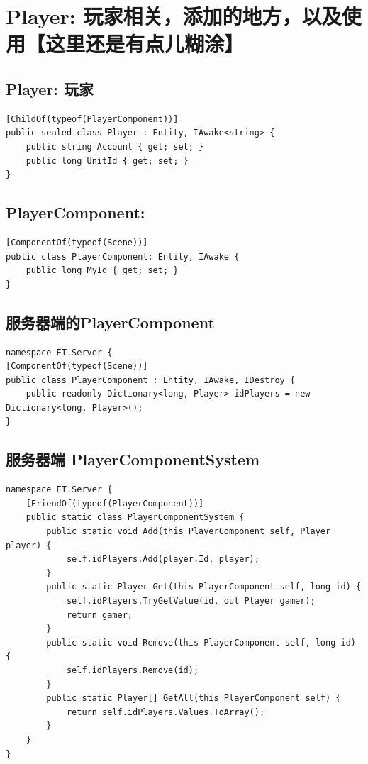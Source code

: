\documentclass[9pt, b5paper]{article}
\begin{document}
\section{Player: 玩家相关，添加的地方，以及使用【这里还是有点儿糊涂】}
\label{sec-9}
\subsection{Player: 玩家}
\label{sec-9-1}
\begin{verbatim}
[ChildOf(typeof(PlayerComponent))]
public sealed class Player : Entity, IAwake<string> {
    public string Account { get; set; }
    public long UnitId { get; set; }
}
\end{verbatim}
\subsection{PlayerComponent:}
\label{sec-9-2}
\begin{verbatim}
[ComponentOf(typeof(Scene))]
public class PlayerComponent: Entity, IAwake {
    public long MyId { get; set; }
}
\end{verbatim}
\subsection{服务器端的PlayerComponent}
\label{sec-9-3}
\begin{verbatim}
namespace ET.Server {
[ComponentOf(typeof(Scene))]
public class PlayerComponent : Entity, IAwake, IDestroy {
    public readonly Dictionary<long, Player> idPlayers = new Dictionary<long, Player>();
}
\end{verbatim}
\subsection{服务器端 PlayerComponentSystem}
\label{sec-9-4}
\begin{verbatim}
namespace ET.Server {
    [FriendOf(typeof(PlayerComponent))]
    public static class PlayerComponentSystem {
        public static void Add(this PlayerComponent self, Player player) {
            self.idPlayers.Add(player.Id, player);
        }
        public static Player Get(this PlayerComponent self, long id) {
            self.idPlayers.TryGetValue(id, out Player gamer);
            return gamer;
        }
        public static void Remove(this PlayerComponent self, long id) {
            self.idPlayers.Remove(id);
        }
        public static Player[] GetAll(this PlayerComponent self) {
            return self.idPlayers.Values.ToArray();
        }
    }
}
\end{verbatim}
\end{document}

